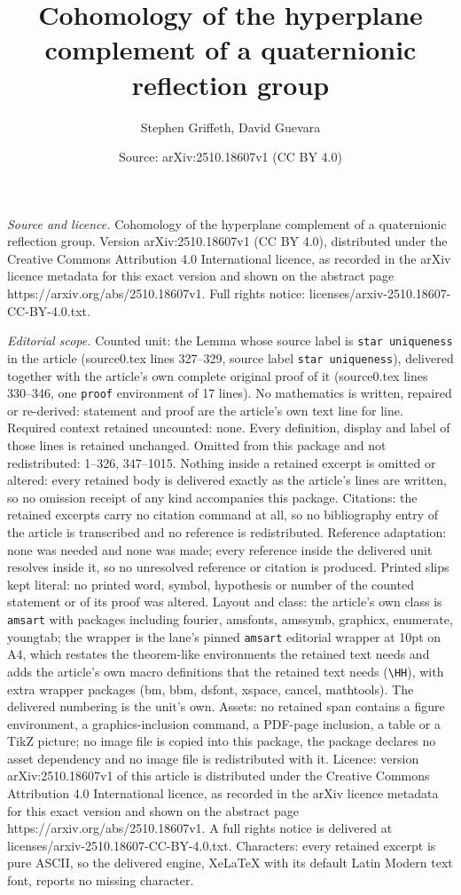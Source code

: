 \documentclass[10pt,a4paper]{amsart}
\title[Cohomology of the hyperplane complement of a quaternionic re]{Cohomology of the hyperplane complement of a quaternionic reflection group}
\author{Stephen Griffeth, David Guevara}
\date{Source: arXiv:2510.18607v1 (CC BY 4.0)}
\begin{document}
\maketitle

\noindent\emph{Source and licence.} Cohomology of the hyperplane complement of a quaternionic reflection group. Version arXiv:2510.18607v1 (CC BY 4.0), distributed under the Creative Commons Attribution 4.0 International licence, as recorded in the arXiv licence metadata for this exact version and shown on the abstract page https://arxiv.org/abs/2510.18607v1. Full rights notice: licenses/arxiv-2510.18607-CC-BY-4.0.txt.\par\smallskip

\noindent\textit{Editorial scope.} Counted unit: the Lemma whose source label is \texttt{star uniqueness} in the article (source0.tex lines 327--329, source label \texttt{star uniqueness}), delivered together with the article's own complete original proof of it (source0.tex lines 330--346, one \texttt{proof} environment of 17 lines). No mathematics is written, repaired or re-derived: statement and proof are the article's own text line for line. Required context retained uncounted: none. Every definition, display and label of those lines is retained unchanged. Omitted from this package and not redistributed: 1--326, 347--1015. Nothing inside a retained excerpt is omitted or altered: every retained body is delivered exactly as the article's lines are written, so no omission receipt of any kind accompanies this package. Citations: the retained excerpts carry no citation command at all, so no bibliography entry of the article is transcribed and no reference is redistributed. Reference adaptation: none was needed and none was made; every reference inside the delivered unit resolves inside it, so no unresolved reference or citation is produced. Printed slips kept literal: no printed word, symbol, hypothesis or number of the counted statement or of its proof was altered. Layout and class: the article's own class is \texttt{amsart} with packages including fourier, amsfonts, amssymb, graphicx, enumerate, youngtab; the wrapper is the lane's pinned \texttt{amsart} editorial wrapper at 10pt on A4, which restates the theorem-like environments the retained text needs and adds the article's own macro definitions that the retained text needs (\texttt{\textbackslash HH}), with extra wrapper packages (bm, bbm, dsfont, xspace, cancel, mathtools). The delivered numbering is the unit's own. Assets: no retained span contains a figure environment, a graphics-inclusion command, a PDF-page inclusion, a table or a TikZ picture; no image file is copied into this package, the package declares no asset dependency and no image file is redistributed with it. Licence: version arXiv:2510.18607v1 of this article is distributed under the Creative Commons Attribution 4.0 International licence, as recorded in the arXiv licence metadata for this exact version and shown on the abstract page https://arxiv.org/abs/2510.18607v1. A full rights notice is delivered at licenses/arxiv-2510.18607-CC-BY-4.0.txt. Characters: every retained excerpt is pure ASCII, so the delivered engine, XeLaTeX with its default Latin Modern text font, reports no missing character.
\end{document}
